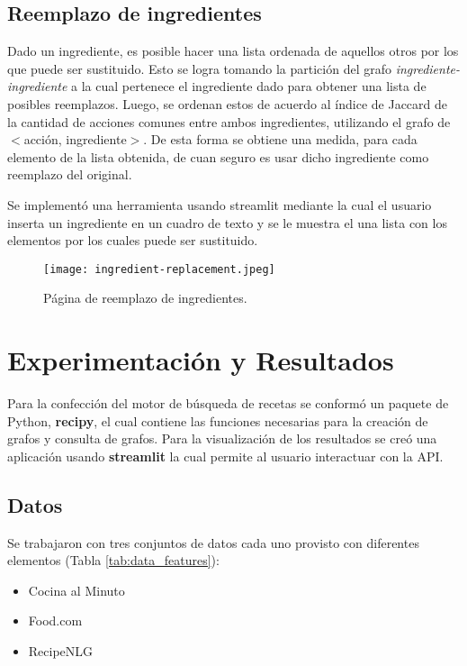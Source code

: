 \documentclass[
	a4paper, %
	10pt, %
	unnumberedsections, %
	twoside, %
]{LTJournalArticle}
\begin{document}
\subsection{Reemplazo de ingredientes}

Dado un ingrediente, es posible hacer una lista ordenada de aquellos otros por los que puede ser sustituido. Esto se logra tomando la partición del grafo \emph{ingrediente-ingrediente} a la cual pertenece el ingrediente dado para obtener una lista de posibles reemplazos. Luego, se ordenan estos de acuerdo al índice de Jaccard de la cantidad de acciones comunes entre ambos ingredientes, utilizando el grafo de $<$acción, ingrediente$>$. De esta forma se obtiene una medida, para cada elemento de la lista obtenida, de cuan seguro es usar dicho ingrediente como reemplazo del original. 

Se implementó una herramienta usando streamlit mediante la cual el usuario inserta un ingrediente en un cuadro de texto y se le muestra el una lista con los elementos por los cuales puede ser sustituido.

\begin{figure}
	\texttt{[image: ingredient-replacement.jpeg]}
	\caption{Página de reemplazo de ingredientes.}
	\label{fig:ingredient-repalcement}
\end{figure}


\section{Experimentación y Resultados}

Para la confección del motor de búsqueda de recetas se conformó un paquete de Python, \textbf{recipy}, el cual
contiene las funciones necesarias para la creación de grafos y consulta de grafos. Para la visualización de los
resultados se creó una aplicación usando \textbf{streamlit} la cual permite al usuario interactuar con la API.

\subsection{Datos}

Se trabajaron con tres conjuntos de datos cada uno provisto con diferentes elementos (Tabla \ref{tab:data_features}):

\begin{itemize}
	\item Cocina al Minuto
	\item Food.com \autocite{majumder2019generating}
	\item RecipeNLG \autocite{bien-etal-2020-recipenlg}
\end{itemize}
\end{document}
